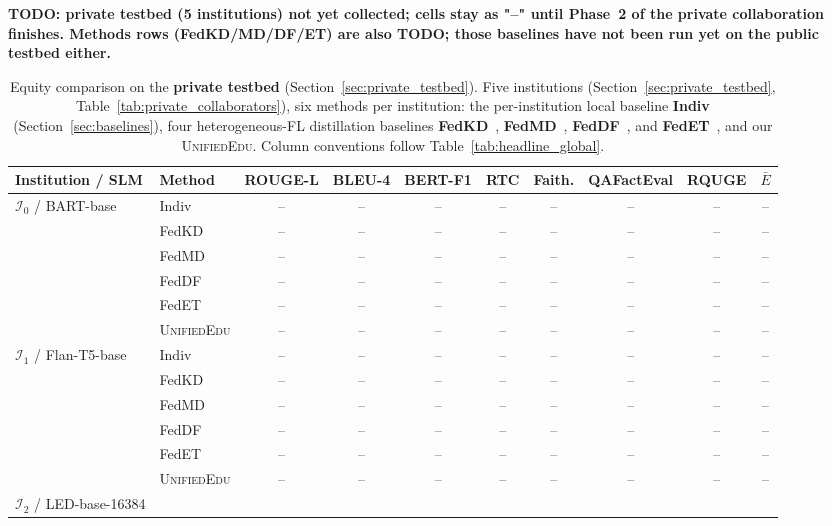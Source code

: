 \documentclass[11pt]{article}
\theoremstyle{plain}
\theoremstyle{definition}
\theoremstyle{remark}
\newcommand{\red}[1]{\textcolor{myred}{\textbf{#1}}}
\newcommand{\UniEdu}{\textsc{UnifiedEdu}}
\begin{document}
\red{TODO: private testbed (5 institutions) not yet collected; cells stay as "--" until Phase~2 of the private collaboration finishes. Methods rows (FedKD/MD/DF/ET) are also TODO; those baselines have not been run yet on the public testbed either.}
\begin{table}[t]
\centering
\small
\caption{Equity comparison on the \textbf{private
testbed} (Section~\ref{sec:private_testbed}). Five
institutions (Section~\ref{sec:private_testbed},
Table~\ref{tab:private_collaborators}), six methods
per institution: the per-institution local baseline
\textbf{Indiv} (Section~\ref{sec:baselines}), four
heterogeneous-FL distillation baselines
\textbf{FedKD}~\citep{wu2022fedkd},
\textbf{FedMD}~\citep{li2019fedmd},
\textbf{FedDF}~\citep{lin2020feddf}, and
\textbf{FedET}~\citep{cheng2022fedet}, and our
\UniEdu{}. Column conventions follow
Table~\ref{tab:headline_global}.}
\label{tab:equity_private}
\begin{tabular}{llcccccccc}
\toprule
\textbf{Institution / SLM} & \textbf{Method} &
\textbf{ROUGE-L} & \textbf{BLEU-4} & \textbf{BERT-F1} &
\textbf{RTC} & \textbf{Faith.} & \textbf{QAFactEval} &
\textbf{RQUGE} & $\bar{E}$ \\
\midrule
\multirow{6}{*}{$\mathcal{I}_0$ / BART-base}
  & Indiv          & -- & -- & -- & -- & -- & -- & -- & -- \\
  & FedKD          & -- & -- & -- & -- & -- & -- & -- & -- \\
  & FedMD          & -- & -- & -- & -- & -- & -- & -- & -- \\
  & FedDF          & -- & -- & -- & -- & -- & -- & -- & -- \\
  & FedET          & -- & -- & -- & -- & -- & -- & -- & -- \\
  & \UniEdu{}      & -- & -- & -- & -- & -- & -- & -- & -- \\
\midrule
\multirow{6}{*}{$\mathcal{I}_1$ / Flan-T5-base}
  & Indiv          & -- & -- & -- & -- & -- & -- & -- & -- \\
  & FedKD          & -- & -- & -- & -- & -- & -- & -- & -- \\
  & FedMD          & -- & -- & -- & -- & -- & -- & -- & -- \\
  & FedDF          & -- & -- & -- & -- & -- & -- & -- & -- \\
  & FedET          & -- & -- & -- & -- & -- & -- & -- & -- \\
  & \UniEdu{}      & -- & -- & -- & -- & -- & -- & -- & -- \\
\midrule
\multirow{6}{*}{$\mathcal{I}_2$ / LED-base-16384}

\end{tabular}
\end{table}
\end{document}
